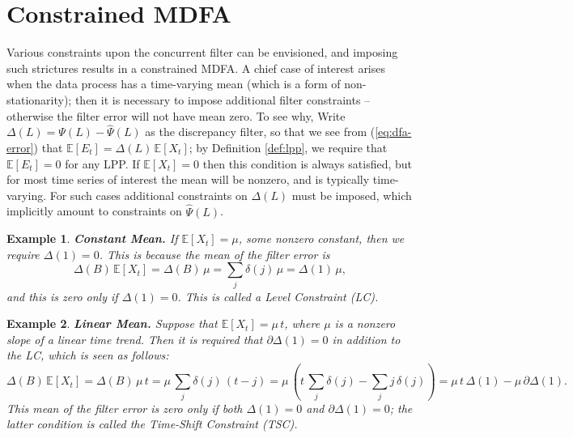\documentclass[a4paper]{book}
\def\EE{\mathbb E}
\newtheorem{Example}{Example}
\begin{document}
\section{Constrained MDFA}
\label{sec:constraint}

 Various constraints upon the concurrent filter can be envisioned, 
   and imposing such strictures results in  a constrained MDFA. 
   A chief case of interest arises when the 
    data process has a time-varying mean (which is a form of  non-stationarity);
  then it is necessary to impose additional filter constraints -- otherwise
   the filter error will not have mean zero.    To see why, 
   Write $\Delta (L) = \Psi (L) - \widehat{\Psi} (L)$ as the discrepancy filter,
   so that we see  from (\ref{eq:dfa-error})  
   that $\EE [ E_t ] = \Delta (L) \, \EE [ X_t ]$; 
   by Definition \ref{def:lpp}, we require
 that $\EE [ E_t ] = 0$ for any LPP.  
  If $\EE [ X_t] = 0$ then this condition is always satisfied, but
   for most time series of interest the mean will be nonzero, and is typically
    time-varying.  For such cases additional constraints on $\Delta (L)$ must be imposed,
    which implicitly amount to constraints on $\widehat{\Psi} (L)$.
    
\begin{Example}    {\bf Constant Mean.}  \rm
\label{exam:constant.mean}
  If $\EE [ X_t ] = \mu$, some nonzero constant,  then we require $\Delta (1) = 0$.
  This is because the mean of the filter error is
  \[
   \Delta (B) \, \EE [ X_t] = \Delta(B) \, \mu = \sum_j \delta (j) \, \mu =
   \Delta (1) \, \mu,
  \]
  and this is zero only if $\Delta (1) = 0$.  This is called a Level Constraint (LC).
\end{Example}  

\begin{Example}    {\bf Linear Mean.}  \rm
\label{exam:linear.mean}
  Suppose that $\EE [ X_t ] = \mu \, t$, where $\mu$ is a nonzero slope
 of a linear time trend.  Then it is required that  $\partial {\Delta} (1) = 0$
  in addition to the LC,  which is seen as follows:
  \[
   \Delta (B) \, \EE [ X_t] = \Delta(B) \, \mu \, t =   \mu \, \sum_j \delta (j) \, (t-j)
   = \mu \, \left(t \, \sum_j \delta (j) - \sum_j j \,\delta (j) \right)
    = \mu \, t \, \Delta(1) - \mu \, \partial \Delta (1).
  \]
  This mean of the filter error  is zero only if both $\Delta(1)=0$ and
  $\partial \Delta (1)=0$; the latter condition is called the
   Time-Shift Constraint (TSC).  
\end{Example}  
\end{document}
